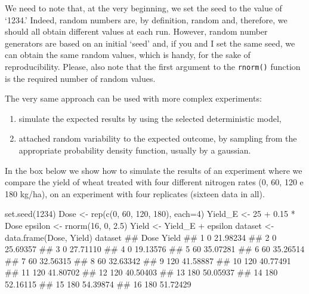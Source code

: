 \documentclass[a4paper,12pt,oneside]{book}
\providecommand{\tightlist}{%
  \setlength{\itemsep}{0pt}\setlength{\parskip}{0pt}}
\newenvironment{Shaded}{\begin{snugshade}}{\end{snugshade}}
\newcommand{\DecValTok}[1]{#1}
\newcommand{\FloatTok}[1]{#1}
\newcommand{\SpecialCharTok}[1]{#1}
\newcommand{\DocumentationTok}[1]{#1}
\newcommand{\OtherTok}[1]{#1}
\newcommand{\FunctionTok}[1]{#1}
\newcommand{\AttributeTok}[1]{#1}
\newcommand{\NormalTok}[1]{#1}
\begin{document}
We need to note that, at the very beginning, we set the seed to the value of `1234.' Indeed, random numbers are, by definition, random and, therefore, we should all obtain different values at each run. However, random number generators are based on an initial `seed' and, if you and I set the same seed, we can obtain the same random values, which is handy, for the sake of reproducibility. Please, also note that the first argument to the \texttt{rnorm()} function is the required number of random values.

The very same approach can be used with more complex experiments:

\begin{enumerate}
\def\labelenumi{\arabic{enumi}.}
\tightlist
\item
  simulate the expected results by using the selected deterministic model,
\item
  attached random variability to the expected outcome, by sampling from the appropriate probability density function, usually by a gaussian.
\end{enumerate}

In the box below we show how to simulate the results of an experiment where we compare the yield of wheat treated with four different nitrogen rates (0, 60, 120 e 180 kg/ha), on an experiment with four replicates (sixteen data in all).

\begin{Shaded}
\begin{Highlighting}[]
\FunctionTok{set.seed}\NormalTok{(}\DecValTok{1234}\NormalTok{)}
\NormalTok{Dose }\OtherTok{\textless{}{-}} \FunctionTok{rep}\NormalTok{(}\FunctionTok{c}\NormalTok{(}\DecValTok{0}\NormalTok{, }\DecValTok{60}\NormalTok{, }\DecValTok{120}\NormalTok{, }\DecValTok{180}\NormalTok{), }\AttributeTok{each=}\DecValTok{4}\NormalTok{) }
\NormalTok{Yield\_E }\OtherTok{\textless{}{-}} \DecValTok{25} \SpecialCharTok{+} \FloatTok{0.15} \SpecialCharTok{*}\NormalTok{ Dose}
\NormalTok{epsilon }\OtherTok{\textless{}{-}} \FunctionTok{rnorm}\NormalTok{(}\DecValTok{16}\NormalTok{, }\DecValTok{0}\NormalTok{, }\FloatTok{2.5}\NormalTok{)}
\NormalTok{Yield }\OtherTok{\textless{}{-}}\NormalTok{ Yield\_E }\SpecialCharTok{+}\NormalTok{ epsilon}
\NormalTok{dataset }\OtherTok{\textless{}{-}} \FunctionTok{data.frame}\NormalTok{(Dose, Yield)}
\NormalTok{dataset}
\DocumentationTok{\#\#    Dose    Yield}
\DocumentationTok{\#\# 1     0 21.98234}
\DocumentationTok{\#\# 2     0 25.69357}
\DocumentationTok{\#\# 3     0 27.71110}
\DocumentationTok{\#\# 4     0 19.13576}
\DocumentationTok{\#\# 5    60 35.07281}
\DocumentationTok{\#\# 6    60 35.26514}
\DocumentationTok{\#\# 7    60 32.56315}
\DocumentationTok{\#\# 8    60 32.63342}
\DocumentationTok{\#\# 9   120 41.58887}
\DocumentationTok{\#\# 10  120 40.77491}
\DocumentationTok{\#\# 11  120 41.80702}
\DocumentationTok{\#\# 12  120 40.50403}
\DocumentationTok{\#\# 13  180 50.05937}
\DocumentationTok{\#\# 14  180 52.16115}
\DocumentationTok{\#\# 15  180 54.39874}
\DocumentationTok{\#\# 16  180 51.72429}
\end{Highlighting}
\end{Shaded}
\end{document}
